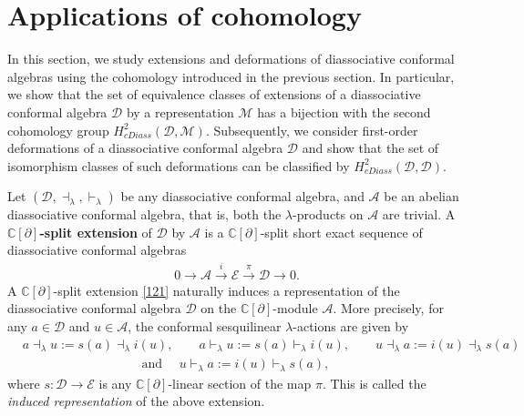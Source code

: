 \documentclass[a4paper,reqno,10pt]{amsart}
\theoremstyle{plain}
\theoremstyle{definition}
\theoremstyle{remark}
\newcommand{\D}{\mathcal{D}}
\newcommand{\M}{\mathcal{M}}
\newcommand{\E}{\mathcal{E}}
\newcommand{\la}{\lambda}
\begin{document}
\section{Applications of cohomology}\label{sec4}

In this section, we study extensions and deformations of diassociative conformal algebras using the cohomology introduced in the previous section. In particular, we show that the set of equivalence classes of extensions of a diassociative conformal algebra $\D$ by a representation $\M$ has a bijection with the second cohomology group $H^2_{cDiass} (\D, \M)$. Subsequently, we consider first-order deformations of a diassociative conformal algebra $\D$ and show that the set of isomorphism classes of such deformations can be classified by $H^2_{cDiass} (\D, \D)$.

 \medskip
   

Let $(\D,\dashv_{\la},\vdash_{\la})$ be any diassociative conformal algebra, and $\mathcal{A}$ be an abelian diassociative conformal algebra, that is, both the $\la$-products on $\mathcal{A}$ are trivial.
A {\bf $\mathbb{C}[\partial]$-split extension} of $\D$ by $\mathcal{A}$ is a $\mathbb{C}[\partial]$-split short exact sequence of diassociative conformal algebras
\begin{align}\label{121}
0\longrightarrow
\mathcal{A}
\xrightarrow{\ i \ }
\E
\xrightarrow{\ \pi\ }
\D
\longrightarrow 0.
\end{align}
A $\mathbb{C}[\partial]$-split extension \eqref{121} naturally induces a {representation} of the diassociative conformal algebra $\D$ on the $\mathbb{C}[\partial]$-module $\mathcal{A}$. More precisely, for any $a \in \D$ and $u \in \mathcal{A}$, the conformal sesquilinear $\la$-actions are given by
\begin{align*}
   & a \dashv_\la u :=  s(a) \dashv_\la i(u)   , \qquad  a \vdash_\la u :=  s(a) \vdash_\la i(u), \qquad  u \dashv_\la a := i(u) \dashv_\la s(a)  \\
   & \qquad \qquad \qquad \qquad \quad \text{ and } \quad u \vdash_\la a := i(u) \vdash_\la s(a),
\end{align*}
where $s : \D \rightarrow \E$ is any $\mathbb{C}[\partial]$-linear section of the map $\pi$. This is called the {\em induced representation} of the above extension.
\end{document}
